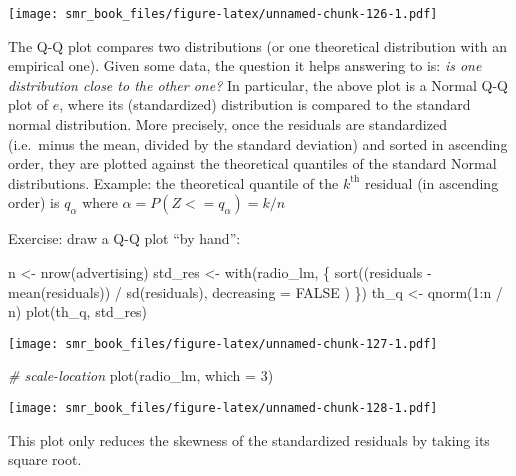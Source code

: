 \documentclass[
  oneside]{book}
\newenvironment{Shaded}{\begin{snugshade}}{\end{snugshade}}
\newcommand{\AttributeTok}[1]{\textcolor[rgb]{0.77,0.63,0.00}{#1}}
\newcommand{\CommentTok}[1]{\textcolor[rgb]{0.56,0.35,0.01}{\textit{#1}}}
\newcommand{\ConstantTok}[1]{\textcolor[rgb]{0.00,0.00,0.00}{#1}}
\newcommand{\DecValTok}[1]{\textcolor[rgb]{0.00,0.00,0.81}{#1}}
\newcommand{\FunctionTok}[1]{\textcolor[rgb]{0.00,0.00,0.00}{#1}}
\newcommand{\NormalTok}[1]{#1}
\newcommand{\OtherTok}[1]{\textcolor[rgb]{0.56,0.35,0.01}{#1}}
\newcommand{\SpecialCharTok}[1]{\textcolor[rgb]{0.00,0.00,0.00}{#1}}
\begin{document}
\texttt{[image: smr\_book\_files/figure-latex/unnamed-chunk-126-1.pdf]}

The Q-Q plot compares two distributions (or one theoretical distribution
with an empirical one). Given some data, the question it helps
answering to is: \emph{is one distribution close to the other one?}
In particular, the above plot is a Normal Q-Q plot of \(e\),
where its (standardized) distribution is compared to the standard
normal distribution.
More precisely, once the residuals are standardized (i.e.~minus the mean,
divided by the standard deviation) and sorted in ascending order, they are
plotted against the theoretical quantiles of the standard Normal distributions.
Example: the theoretical quantile of the \(k^{\text{th}}\) residual (in ascending
order) is \(q_{\alpha}\) where \(\alpha = P(Z <= q_{\alpha}) = k / n\)

Exercise: draw a Q-Q plot ``by hand'':

\begin{Shaded}
\begin{Highlighting}[]
\NormalTok{n }\OtherTok{\textless{}{-}} \FunctionTok{nrow}\NormalTok{(advertising)}
\NormalTok{std\_res }\OtherTok{\textless{}{-}} \FunctionTok{with}\NormalTok{(radio\_lm, \{}
  \FunctionTok{sort}\NormalTok{((residuals }\SpecialCharTok{{-}} \FunctionTok{mean}\NormalTok{(residuals)) }\SpecialCharTok{/} \FunctionTok{sd}\NormalTok{(residuals),}
    \AttributeTok{decreasing =} \ConstantTok{FALSE}
\NormalTok{  )}
\NormalTok{\})}
\NormalTok{th\_q }\OtherTok{\textless{}{-}} \FunctionTok{qnorm}\NormalTok{(}\DecValTok{1}\SpecialCharTok{:}\NormalTok{n }\SpecialCharTok{/}\NormalTok{ n)}
\FunctionTok{plot}\NormalTok{(th\_q, std\_res)}
\end{Highlighting}
\end{Shaded}

\texttt{[image: smr\_book\_files/figure-latex/unnamed-chunk-127-1.pdf]}

\begin{Shaded}
\begin{Highlighting}[]
\CommentTok{\# scale{-}location}
\FunctionTok{plot}\NormalTok{(radio\_lm, }\AttributeTok{which =} \DecValTok{3}\NormalTok{)}
\end{Highlighting}
\end{Shaded}

\texttt{[image: smr\_book\_files/figure-latex/unnamed-chunk-128-1.pdf]}

This plot only reduces the skewness of the standardized
residuals by taking its square root.
\end{document}
